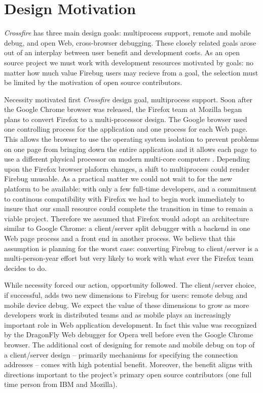 \section{Design Motivation}
\textit{Crossfire} has three main design goals: multiprocess support, remote and
mobile debug, and open Web, cross-browser debugging.
These closely related goals arose out of an interplay between user benefit and development costs.
As an open source project we must work with development resources motivated by
goals: no matter how much value Firebug users may recieve from a goal, the
selection must be limited by the motivation of open source contributors.

Necessity motivated first \textit{Crossfire} design goal, multiprocess support.
Soon after the Google Chrome browser was released, the Firefox team at Mozilla
began plans to convert Firefox to a multi-processor design.  The Google browser
used one controlling process for the application and one process for each Web
page.  This allows the browser to use the operating system isolation to prevent
problems on one page from bringing down the entire application and it allows
each page to use a different physical processor on modern multi-core computers
\cite{GoogleChrome}.  Depending upon the Firefox browser plaform changes, a
shift to multiprocess could render Firebug unusable. As a practical matter we
could not wait to for the new platform to be available: with only a few full-time
developers, and a commitment to continous
compatibility with Firefox we had to begin work immediately to insure that our
small resource could complete the transition in time to remain a viable project.
Therefore we assumed that Firefox would adopt an architecture similar to Google
Chrome: a client/server split debugger with a backend in one Web page process
and a front end in another process.  We believe that this assumption is planning
for the worst case: converting Firebug to client/server is a multi-person-year
effort but very likely to work with what ever the Firefox team decides to do.

While necessity forced our action, opportunity followed. The client/server
choice, if successful, adds two new dimensions to Firebug for users: remote
debug and mobile device debug. We expect the value of these dimensions to grow
as more developers work in distributed teams and as mobile plays an increasingly
important role in Web application development.  In fact this value was
recognized by the DragonFly Web debugger for Opera well before even the Google
Chrome browser.   The additional cost of designing for remote and mobile debug
on top of a client/server design -- primarily mechanisms for specifying the
connection addresses -- comes with high potential benefit.  Moreover, the benefit
aligns with directions important to the project's primary open source
contributors (one full time person from IBM and Mozilla).

